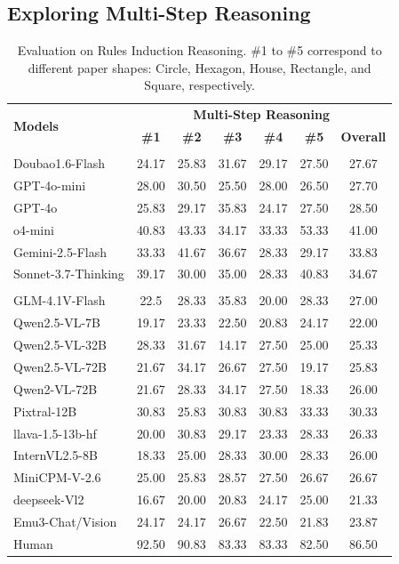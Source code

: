 \documentclass[letterpaper]{article} %
\begin{document}
\subsection{Exploring Multi-Step Reasoning}


\begin{table}[b]
\setlength{\tabcolsep}{1mm} 
\centering
\begin{tabular}{l|cccccc}
\toprule
\multirow{2}{*}{\textbf{Models}} & \multicolumn{6}{c}{\textbf{Multi-Step Reasoning}} \\
 & \textbf{\#1} & \textbf{\#2} & \textbf{\#3} & \textbf{\#4} & \textbf{\#5} & \textbf{Overall} \\
\midrule
\rowcolor{yellow!20}\multicolumn{7}{l}{\textbf{\textit{Proprietary}}} \\
Doubao1.6-Flash &24.17 &25.83 &31.67 &29.17 &27.50 &27.67 \\
GPT-4o-mini &28.00 &30.50 &25.50 &28.00 &26.50 &27.70 \\
GPT-4o & 25.83 &29.17 & 35.83 &24.17 &27.50 &28.50 \\
o4-mini & \cellcolor{gray!30}40.83 &\cellcolor{gray!30}43.33 & 34.17 &\cellcolor{gray!30}33.33 &\cellcolor{gray!30}53.33&\cellcolor{gray!30}41.00 \\
Gemini-2.5-Flash &33.33 &41.67 &\cellcolor{gray!30}36.67 &28.33 &29.17 &33.83 \\
Sonnet-3.7-Thinking &39.17 &30.00 & 35.00 &28.33 &40.83 &34.67\\
\midrule
\rowcolor{yellow!20}\multicolumn{7}{l}{\textbf{\textit{Open-source}}} \\
GLM-4.1V-Flash & 22.5 & 28.33 & 35.83 & 20.00 & 28.33 & 27.00 \\
Qwen2.5-VL-7B &19.17 &23.33 &22.50& 20.83 &24.17 & 22.00\\
Qwen2.5-VL-32B &28.33 &31.67 &14.17 & 27.50 &25.00 & 25.33\\
Qwen2.5-VL-72B &21.67 &34.17 &26.67 &27.50 &19.17 & 25.83 \\
Qwen2-VL-72B &21.67 &28.33 &34.17 &27.50 &18.33 & 26.00 \\
Pixtral-12B &30.83 & 25.83& 30.83& 30.83 &33.33 & 30.33\\
llava-1.5-13b-hf &20.00 &30.83 & 29.17&23.33 &28.33 & 26.33 \\
InternVL2.5-8B & 18.33& 25.00&28.33 & 30.00 &28.33 &26.00\\
MiniCPM-V-2.6 & 25.00& 25.83 &28.57& 27.50 &26.67 & 26.67\\
deepseek-Vl2 &16.67&20.00&20.83&24.17&25.00&21.33\\
Emu3-Chat/Vision &24.17&24.17&26.67&22.50&21.83&23.87\\
\midrule
Human&92.50&90.83&83.33&83.33&82.50&86.50\\
\bottomrule
\end{tabular}
\caption{Evaluation on Rules Induction Reasoning. \#1 to \#5 correspond to different paper shapes: Circle, Hexagon, House, Rectangle, and Square, respectively.}
\label{tab:rules induction}
\end{table}
\end{document}
